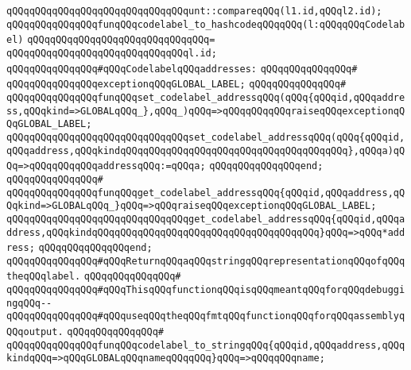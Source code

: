 \verb|qQQqqQQqqQQqqQQqqQQqqQQqqQQqqQQqunt::compareqQQq(l1.id,qQQql2.id);|\newline
\newline
\verb|qQQqqQQqqQQqqQQqfunqQQqcodelabel_to_hashcodeqQQqqQQq(l:qQQqqQQqCodelabel)|\newline
\verb|qQQqqQQqqQQqqQQqqQQqqQQqqQQqqQQq=|\newline
\verb|qQQqqQQqqQQqqQQqqQQqqQQqqQQqqQQql.id;|\newline
\newline
\newline
\verb|qQQqqQQqqQQqqQQq#qQQqCodelabelqQQqaddresses:|\newline
\verb|qQQqqQQqqQQqqQQq#|\newline
\verb|qQQqqQQqqQQqqQQqexceptionqQQqGLOBAL_LABEL;|\newline
\verb|qQQqqQQqqQQqqQQq#|\newline
\verb|qQQqqQQqqQQqqQQqfunqQQqset_codelabel_addressqQQq(qQQq{qQQqid,qQQqaddress,qQQqkind=>GLOBALqQQq_},qQQq_)qQQq=>qQQqqQQqqQQqraiseqQQqexceptionqQQqGLOBAL_LABEL;|\newline
\verb|qQQqqQQqqQQqqQQqqQQqqQQqqQQqqQQqset_codelabel_addressqQQq(qQQq{qQQqid,qQQqaddress,qQQqkindqQQqqQQqqQQqqQQqqQQqqQQqqQQqqQQqqQQqqQQq},qQQqa)qQQq=>qQQqqQQqqQQqaddressqQQq:=qQQqa;|\newline
\verb|qQQqqQQqqQQqqQQqend;|\newline
\verb|qQQqqQQqqQQqqQQq#|\newline
\verb|qQQqqQQqqQQqqQQqfunqQQqget_codelabel_addressqQQq{qQQqid,qQQqaddress,qQQqkind=>GLOBALqQQq_}qQQq=>qQQqraiseqQQqexceptionqQQqGLOBAL_LABEL;|\newline
\verb|qQQqqQQqqQQqqQQqqQQqqQQqqQQqqQQqget_codelabel_addressqQQq{qQQqid,qQQqaddress,qQQqkindqQQqqQQqqQQqqQQqqQQqqQQqqQQqqQQqqQQqqQQq}qQQq=>qQQq*address;|\newline
\verb|qQQqqQQqqQQqqQQqend;|\newline
\newline
\verb|qQQqqQQqqQQqqQQq#qQQqReturnqQQqaqQQqstringqQQqrepresentationqQQqofqQQqtheqQQqlabel.|\newline
\verb|qQQqqQQqqQQqqQQq#|\newline
\verb|qQQqqQQqqQQqqQQq#qQQqThisqQQqfunctionqQQqisqQQqmeantqQQqforqQQqdebuggingqQQq--|\newline
\verb|qQQqqQQqqQQqqQQq#qQQquseqQQqtheqQQqfmtqQQqfunctionqQQqforqQQqassemblyqQQqoutput.|\newline
\verb|qQQqqQQqqQQqqQQq#|\newline
\verb|qQQqqQQqqQQqqQQqfunqQQqcodelabel_to_stringqQQq{qQQqid,qQQqaddress,qQQqkindqQQq=>qQQqGLOBALqQQqnameqQQqqQQq}qQQq=>qQQqqQQqname;|\newline
